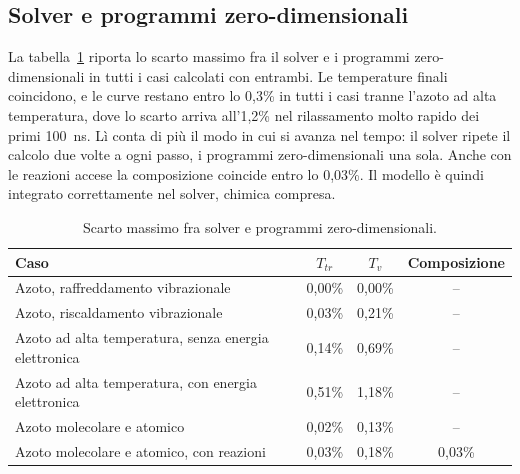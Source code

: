 \subsection{Solver e programmi zero-dimensionali}
\label{sec:risultati-solver}

La tabella~\ref{tab:solver} riporta lo scarto massimo fra il solver e i
programmi zero-dimensionali in tutti i casi calcolati con entrambi. Le
temperature finali coincidono, e le curve restano entro lo 0{,}3\% in tutti i casi tranne
l'azoto ad alta temperatura, dove lo scarto arriva all'1{,}2\% nel
rilassamento molto rapido dei primi 100~ns. Lì conta di più il modo in cui si
avanza nel tempo: il solver ripete il calcolo due volte a ogni passo, i
programmi zero-dimensionali una sola. Anche con le reazioni accese la
composizione coincide entro lo 0{,}03\%. Il modello è quindi integrato
correttamente nel solver, chimica compresa.

\begin{table}[ht]
  \centering
  \caption{Scarto massimo fra solver e programmi zero-dimensionali.}
  \label{tab:solver}
  \small
  \begin{tabular}{lccc}
    \toprule
    Caso & $T_{tr}$ & $T_{v}$ & Composizione \\
    \midrule
    Azoto, raffreddamento vibrazionale              & 0{,}00\% & 0{,}00\% & -- \\
    Azoto, riscaldamento vibrazionale               & 0{,}03\% & 0{,}21\% & -- \\
    Azoto ad alta temperatura, senza energia elettronica & 0{,}14\% & 0{,}69\% & -- \\
    Azoto ad alta temperatura, con energia elettronica   & 0{,}51\% & 1{,}18\% & -- \\
    Azoto molecolare e atomico                      & 0{,}02\% & 0{,}13\% & -- \\
    Azoto molecolare e atomico, con reazioni        & 0{,}03\% & 0{,}18\% & 0{,}03\% \\
    \bottomrule
  \end{tabular}
\end{table}
